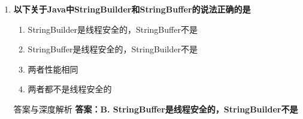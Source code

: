 \documentclass[12pt, a4paper]{ctexart}
\begin{document}
\begin{enumerate}[label=\textbf{\arabic*.}]
	      \begin{bluebox}{答案与深度解析}
		      \textbf{答案：B. 抑制指定类型的警告}

		      \textbf{【选项原理深度拆解】}
					  \begin{itemize}[label={}, leftmargin=*, nosep]


		      \item \textbf{A. 抑制所有的警告 — 错误}
					  \begin{itemize}[label={}, nosep]
		      
			      \item 需要指定具体警告类型

					  \end{itemize}
		      \item \textbf{B. 抑制指定类型的警告 — 正确}
					  \begin{itemize}[label={}, nosep]
		      
			      \item @SuppressWarnings("unchecked")、@SuppressWarnings("deprecation")等
		      

					  \end{itemize}
		      \item \textbf{C/D — 错误}
					  \begin{itemize}[label={}, nosep]
		      
			      \item 与注释无关，不能增加警告
		      
		      

	      
					  \end{itemize}
					  \end{itemize}
\end{bluebox}

	      \vspace{1em}

	\item \textbf{以下关于Java中StringBuilder和StringBuffer的说法正确的是}
	      \begin{enumerate}[label=\Alph*.]
		      \item StringBuilder是线程安全的，StringBuffer不是
		      \item StringBuffer是线程安全的，StringBuilder不是
		      \item 两者性能相同
		      \item 两者都不是线程安全的
	      \end{enumerate}

	      \begin{bluebox}{答案与深度解析}
		      \textbf{答案：B. StringBuffer是线程安全的，StringBuilder不是}


\end{bluebox}
\end{enumerate}
\end{document}
